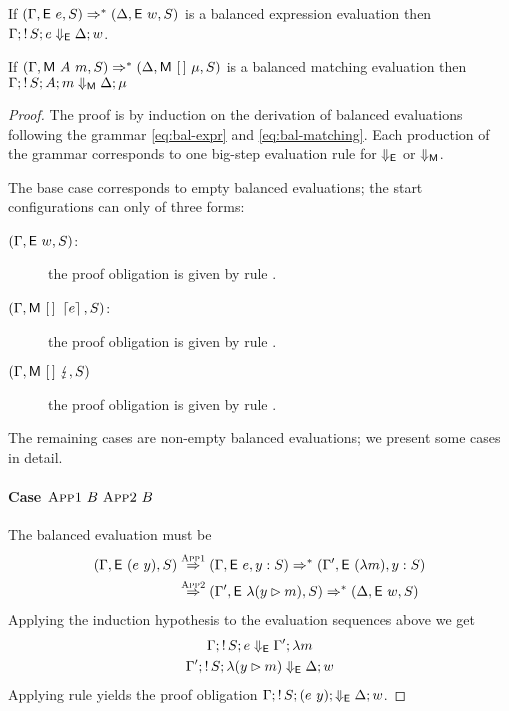 \begin{theorem}
  If $(\Gamma, \textsf{E}~e, S) \Rightarrow^{*} (\Delta, \textsf{E}~w,
  S)$ is a balanced expression evaluation then
  $\Gamma;\mathop{!}{S}; e \Downarrow_{\textsf{E}} \Delta; w$.

  If $(\Gamma, \textsf{M}~A~m, S) \Rightarrow^{*} (\Delta,
  \textsf{M}~[\,]~\mu, S)$ is a balanced matching evaluation then
  $\Gamma;\mathop{!}{S}; A;m \Downarrow_{\textsf{M}} \Delta;\mu$
\end{theorem}

\begin{proof}
  The proof is by induction on the derivation of balanced evaluations
  following the grammar \eqref{eq:bal-expr} and
  \eqref{eq:bal-matching}.  Each production of the grammar corresponds
  to one big-step evaluation rule for $\Downarrow_{\textsf{E}}$ or $\Downarrow_{\textsf{M}}$.

  The base case corresponds to empty balanced evaluations;
  the start configurations can only of three forms:
  \begin{description}
  \item[$(\Gamma, \textsf{E}~w, S)$:]
    the proof obligation is given by rule .
  \item [$(\Gamma, \textsf{M}~[\,]~\left\lceil e\right\rceil, S)$:]
    the proof obligation is given by rule .
  \item [$(\Gamma, \textsf{M}~[\,]~\lightning, S)$]
    the proof obligation is given by rule .
  \end{description}

  The remaining cases are non-empty balanced evaluations; we present
  some cases in detail.
  
  \paragraph{Case $\textsc{App1}~B~\textsc{App2}~B$}
  The balanced evaluation must be
  \[
    \begin{split}
      (\Gamma,\textsf{E}~(e~y), S) & \stackrel{\textsc{App1}}{\Rightarrow}
      (\Gamma, \textsf{E}~e, y:S) \Rightarrow^{*}
      (\Gamma', \textsf{E}~(\lambda m), y:S) \\
      & \stackrel{\textsc{App2}}{\Rightarrow}
      (\Gamma', \textsf{E}~\lambda (y\rhd m), S)
      \Rightarrow^{*} (\Delta, \textsf{E}~w, S)
    \end{split}
  \]
  Applying the induction hypothesis to the evaluation sequences above we get
  \begin{gather*}
    \Gamma;\mathop{!}{S};e \Downarrow_{\textsf{E}} \Gamma'; \lambda m \\
    \Gamma';\mathop{!}{S};\lambda(y\rhd m) \Downarrow_{\textsf{E}} \Delta;w
  \end{gather*}
  Applying rule  yields the proof obligation
  $\Gamma;\mathop{!}{S};(e~y); \Downarrow_{\textsf{E}} \Delta; w$.


\end{proof}
